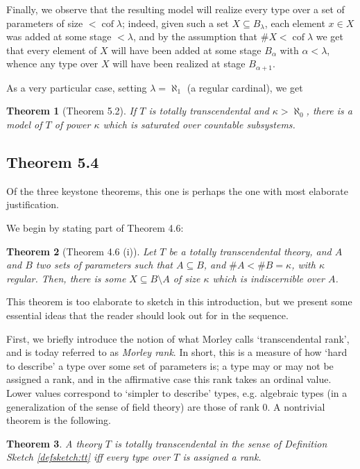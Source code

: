 \documentclass{article}
\newtheorem{theorem}{Theorem}[section]
\theoremstyle{nonumberplain}
\DeclareMathOperator{\cof}{cof}
\newcommand{\card}[1]{\#{#1}}
\begin{document}
Finally, we observe that the resulting model will realize every type over a set of parameters of size $<\cof\lambda$; indeed, given such a set $X \subseteq B_\lambda$, each element $x \in X$ was added at some stage $<\lambda$, and by the assumption that $\card X < \cof \lambda$ we get that every element of $X$ will have been added at some stage $B_\alpha$ with $\alpha < \lambda$, whence any type over $X$ will have been realized at stage $B_{\alpha+1}$.

As a very particular case, setting $\lambda = \aleph_1$ (a regular cardinal), we get
\begin{theorem}[Theorem 5.2]
If $T$ is totally transcendental and $\kappa > \aleph_0$, there is a model of $T$ of power $\kappa$ which is saturated over countable subsystems.
\end{theorem}

\subsection{Theorem 5.4}

Of the three keystone theorems, this one is perhaps the one with most elaborate justification.

We begin by stating part of Theorem 4.6:

\begin{theorem}[Theorem 4.6 (i)] \label{thm:intro4.6}
Let $T$ be a totally transcendental theory, and $A$ and $B$ two sets of parameters such that $A \subseteq B$, and $\card A < \card B = \kappa$, with $\kappa$ regular. Then, there is some $X \subseteq B \setminus A$ of size $\kappa$ which is indiscernible over $A$.
\end{theorem}

This theorem is too elaborate to sketch in this introduction, but we present some essential ideas that the reader should look out for in the sequence.

First, we briefly introduce the notion of what Morley calls `transcendental rank', and is today referred to as \emph{Morley rank}. In short, this is a measure of how `hard to describe' a type over some set of parameters is; a type may or may not be assigned a rank, and in the affirmative case this rank takes an ordinal value. Lower values correspond to `simpler to describe' types, e.g. algebraic types (in a generalization of the sense of field theory) are those of rank $0$. A nontrivial theorem is the following.
\begin{theorem}
A theory $T$ is totally transcendental in the sense of Definition Sketch \ref{defsketch:tt} iff every type over $T$ is assigned a rank.
\end{theorem}
\end{document}
